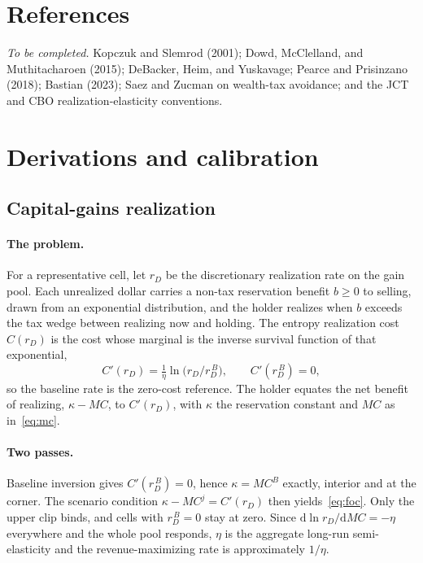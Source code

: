 \documentclass[11pt]{article}
\begin{document}
\section{References}
\label{sec:references}
\emph{To be completed.} Kopczuk and Slemrod (2001); Dowd, McClelland, and
Muthitacharoen (2015); DeBacker, Heim, and Yuskavage; Pearce and Prisinzano
(2018); Bastian (2023); Saez and Zucman on wealth-tax avoidance; and the JCT and
CBO realization-elasticity conventions.

\appendix
\section{Derivations and calibration}
\label{sec:appendix}

\subsection{Capital-gains realization}
\label{sec:app-realization}

\paragraph{The problem.}
For a representative cell, let $r_D$ be the discretionary realization rate on the
gain pool. Each unrealized dollar carries a non-tax reservation benefit $b\ge0$
to selling, drawn from an exponential distribution, and the holder realizes when
$b$ exceeds the tax wedge between realizing now and holding. The entropy
realization cost $C(r_D)$ is the cost whose marginal is the inverse survival
function of that exponential,
\begin{equation}
\label{eq:cprime}
C'(r_D) = \tfrac{1}{\eta}\ln\!\big(r_D/r_D^{\,B}\big),
\qquad C'(r_D^{\,B}) = 0,
\end{equation}
so the baseline rate is the zero-cost reference. The holder equates the net
benefit of realizing, $\kappa-MC$, to $C'(r_D)$, with $\kappa$ the reservation
constant and $MC$ as in~\eqref{eq:mc}.

\paragraph{Two passes.}
Baseline inversion gives $C'(r_D^{\,B})=0$, hence $\kappa=MC^{B}$ exactly,
interior and at the corner. The scenario condition $\kappa-MC^{j}=C'(r_D)$ then
yields~\eqref{eq:foc}. Only the upper clip binds, and cells with $r_D^{\,B}=0$
stay at zero. Since $\mathrm{d}\ln r_D/\mathrm{d}MC=-\eta$ everywhere and the
whole pool responds, $\eta$ is the aggregate long-run semi-elasticity and the
revenue-maximizing rate is approximately $1/\eta$.
\end{document}
